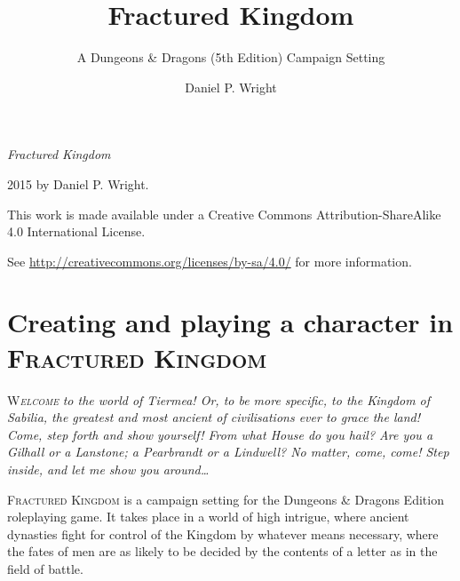 \documentclass[10pt,twoside,openright,a4paper,twocolumn]{book}
\title{Fractured Kingdom}
\subtitle{A Dungeons \& Dragons (5th Edition) Campaign Setting}
\author{Daniel P. Wright}
\begin{document}

\begin{titlingpage}
\factionstitle
\end{titlingpage}
\restoregeometry

\frontmatter
{}

\onecolumn
\thispagestyle{empty}
\null\vfill
\begin{flushleft}
\textit{Fractured Kingdom}

{\textcopyright} 2015 by Daniel P. Wright.

\bigskip

{\ccLogo} {\ccAttribution} {\ccShareAlike}

This work is made available under a Creative Commons Attribution-ShareAlike 4.0 International License.

See \url{http://creativecommons.org/licenses/by-sa/4.0/} for more information.
\end{flushleft}
\twocolumn

\cleardoublepage

\tableofcontents

\thispagestyle{empty}

\mainmatter


\chapter{Creating and playing a character in \textsc{Fractured Kingdom}}
\label{chap:character-creation}

\lettrine{W}{\textit{elcome}} \textit{to the world of Tiermea! Or, to be more
specific, to the Kingdom of Sabilia, the greatest and most ancient of
civilisations ever to grace the land!  Come, step forth and show yourself!
From what House do you hail?  Are you a Gilhall or a Lanstone; a Pearbrandt or
a Lindwell?  No matter, come, come!  Step inside, and let me show you
around\dots}

\textsc{Fractured Kingdom} is a campaign setting for the Dungeons \& Dragons
 Edition roleplaying game.  It takes place in a world of high
intrigue, where ancient dynasties fight for control of the Kingdom by whatever
means necessary, where the fates of men are as likely to be decided by the
contents of a letter as in the field of battle.
\end{document}

